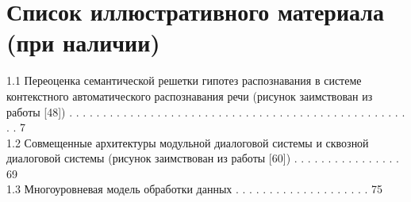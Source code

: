 \clearpage
\chapter*{Список иллюстративного материала (при наличии)}
1.1 Переоценка семантической решетки гипотез распознавания в системе контекстного автоматического распознавания речи (рисунок заимствован из работы [48]) . . . . . . . . . . . . . . . . . . . . . . . . . . . . . . . . . . . . . . . . . . . . . . . . . . . . 7\\

1.2 Совмещенные архитектуры модульной диалоговой системы и сквозной диалоговой системы (рисунок заимствован из работы [60]) . . . . . . . . . . . . . . . . 69\\
 
1.3 Многоуровневая модель обработки данных . . . . . . . . . . . . . . . . . . . .  75
\clearpage
\listoftables   %
\newpage

